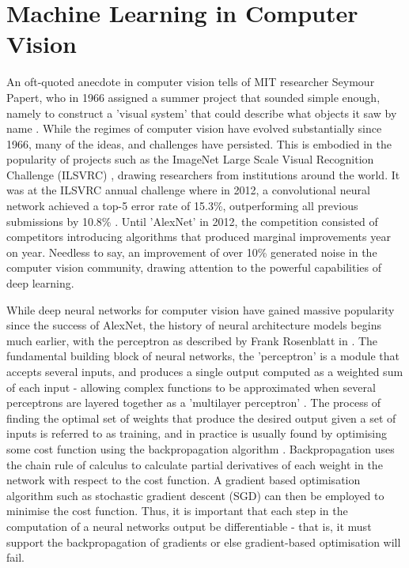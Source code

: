 \documentclass[openany]{book}
\begin{document}
\section{Machine Learning in Computer Vision}


An oft-quoted anecdote in computer vision tells of MIT researcher Seymour Papert, who in 1966 assigned a summer project that sounded simple enough, namely to construct a 'visual system' that could describe what objects it saw by name \cite{papert1966vision}. While the regimes of computer vision have evolved substantially since 1966, many of the ideas, and challenges have persisted. This is embodied in the popularity of projects such as the ImageNet Large Scale Visual Recognition Challenge (ILSVRC) \cite{ilsvrc}, drawing researchers from institutions around the world. It was at the ILSVRC annual challenge where in 2012, a convolutional neural network achieved a top-5 error rate of 15.3\%, outperforming all previous submissions by 10.8\% \cite{krizhevsky2012alexnet}. Until 'AlexNet' in 2012, the competition consisted of competitors introducing algorithms that produced marginal improvements year on year. Needless to say, an improvement of over 10\% generated noise in the computer vision community, drawing attention to the powerful capabilities of deep learning.

While deep neural networks for computer vision have gained massive popularity since the success of AlexNet, the history of neural architecture models begins much earlier, with the perceptron as described by Frank Rosenblatt in \cite{rosenblatt1959neurodynamics}. The fundamental building block of neural networks, the 'perceptron' is a module that accepts several inputs, and produces a single output computed as a weighted sum of each input - allowing complex functions to be approximated when several perceptrons are layered together as a 'multilayer perceptron' \cite{minsky1969perceptrons}. The process of finding the optimal set of weights that produce the desired output given a set of inputs is referred to as training, and in practice is usually found by optimising some cost function using the backpropagation algorithm \cite{rumelhart1986backprop}. Backpropagation uses the chain rule of calculus to calculate partial derivatives of each weight in the network with respect to the cost function. A gradient based optimisation algorithm such as stochastic gradient descent (SGD) can then be employed to minimise the cost function. Thus, it is important that each step in the computation of a neural networks output be differentiable - that is, it must support the backpropagation of gradients or else gradient-based optimisation will fail.
\end{document}
